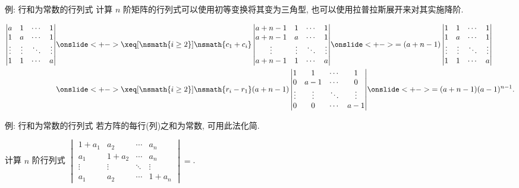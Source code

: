 \begin{frame}{例: 行和为常数的行列式}
	\onslide<+->
	计算 $n$ 阶矩阵的行列式可以使用初等变换将其变为三角型, 也可以使用拉普拉斯展开来对其实施降阶.
	\onslide<+->
	\begin{example}
		\begin{align*}
			\begin{vmatrix}
				a&1&\cdots&1\\
				1&a&\cdots&1\\
				\vdots&\vdots&\ddots&\vdots\\
				1&1&\cdots&a
			\end{vmatrix}
		&\onslide<+->{\xeq[\nsmath{i\ge2}]{\nsmath{c_1+c_i}}\begin{vmatrix}
				a+n-1&1&\cdots&1\\
				a+n-1&a&\cdots&1\\
				\vdots&\vdots&\ddots&\vdots\\
				a+n-1&1&\cdots&a
			\end{vmatrix}}
		\onslide<+->{=(a+n-1)\begin{vmatrix}
				1&1&\cdots&1\\
				1&a&\cdots&1\\
				\vdots&\vdots&\ddots&\vdots\\
				1&1&\cdots&a
			\end{vmatrix}}\\
		&\onslide<+->{\xeq[\nsmath{i\ge2}]{\nsmath{r_i-r_1}}(a+n-1)\begin{vmatrix}
				1&1&\cdots&1\\
				0&a-1&\cdots&0\\
				\vdots&\vdots&\ddots&\vdots\\
				0&0&\cdots&a-1
			\end{vmatrix}}
		\onslide<+->{=(a+n-1)(a-1)^{n-1}.}
		\end{align*}
	\end{example}
\end{frame}


\begin{frame}{例: 行和为常数的行列式}
	\onslide<+->
	若方阵的每行(列)之和为常数, 可用此法化简.
	\onslide<+->
	\begin{exercise}
		计算 $n$ 阶行列式 $\begin{vmatrix}
			1+a_1&a_2&\cdots&a_n\\
			a_1&1+a_2&\cdots&a_n\\
			\vdots&\vdots&\ddots&\vdots\\
			a_1&a_2&\cdots&1+a_n
		\end{vmatrix}=$.
	\end{exercise}
\end{frame}


